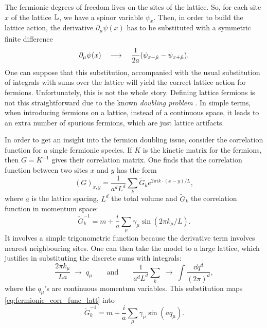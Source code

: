 The fermionic degrees of freedom lives on the sites of the lattice.
So, for each site $x$ of the lattice $\mathbb{L}$, we have a spinor variable $\psi_x$.
Then, in order to build the lattice action, the derivative $\partial_{\mu} \psi(x)$ has to be substituted with a symmetric finite difference
\begin{equation*}
    \partial_{\mu} \psi(x)
    \quad \longrightarrow \quad
    \frac{1}{2 a} \qty( \psi_{x - \hat{\mu}} - \psi_{x + \hat{\mu}}).
\end{equation*}
One can suppose that this substitution, accompanied with the usual substitution of integrals with sums over the lattice will yield the correct lattice action for fermions.
Unfortunately, this is not the whole story.
Defining lattice fermions is not this straightforward due to the known \emph{doubling problem} \cite{nielsen1981fermions, susskind1977fermions}.
In simple terms, when introducing fermions on a lattice, instead of a continuous space, it leads to an extra number of spurious fermions, which are just lattice artifacts.

In order to get an insight into the fermion doubling issue, consider the correlation function for a single fermionic species.
If $K$ is the kinetic matrix for the fermions, then $G = K^{-1}$ gives their correlation matrix.
One finds that the correlation function between two sites $x$ and $y$ has the form \cite{creutz1985book}
\begin{equation}
    (G)_{x,y} = \frac{1}{a^d L^d} \sum_{k} \tilde{G}_{k} e^{2 \pi i k \cdot (x - y) / L},
    \label{eq:fermionic_corr_func_real_space}
\end{equation}
where $a$ is the lattice spacing, $L^d$ the total volume and $\tilde{G}_k$ the correlation function in momentum space:
\begin{equation}
    \tilde{G}^{-1}_k = m + \frac{i}{a} \sum_{\mu} \gamma_{\mu} \sin(2 \pi k_{\mu} / L).
    \label{eq:fermionic_corr_func_latt}
\end{equation}
It involves a simple trigonometric function because the derivative term involves nearest neighbouring sites.
One can then take the model to a large lattice, which justifies in substituting the discrete sums with integrals:
\begin{equation}
    \frac{2 \pi k_{\mu}}{La}  \; \to \; q_{\mu}
    \qquad \text{and} \qquad
    \frac{1}{a^d L^d} \sum_{k} \; \to \; \int \frac{\dd q^d}{(2 \pi)^d},
    \label{eq:limit_large_lattice}
\end{equation}
where the $q_{\mu}$'s are continuous momentum variables.
This substitution maps \eqref{eq:fermionic_corr_func_latt} into
\begin{equation}
    \tilde{G}_k^{-1} = m + \frac{i}{a} \sum_{\mu} \gamma_{\mu} \sin(a q_{\mu}).
    \label{eq:fermionic_corr_func_large_latt}
\end{equation}

